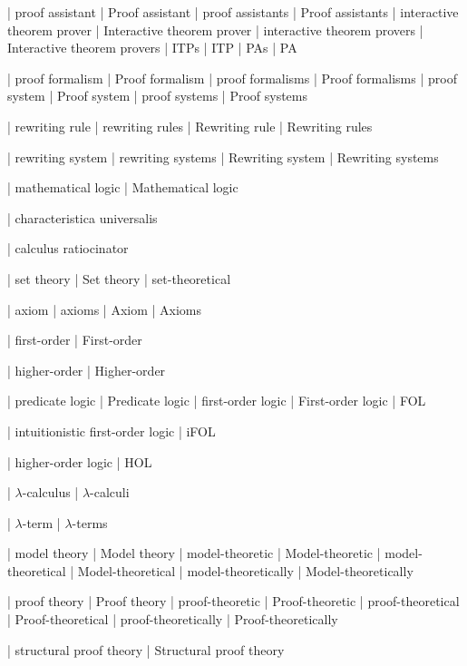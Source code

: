 
 | proof assistant
 | Proof assistant
 | proof assistants
 | Proof assistants
 | interactive theorem prover
 | Interactive theorem prover
 | interactive theorem provers
 | Interactive theorem provers
 | ITPs
 | ITP
 | PAs
 | PA

 | proof formalism
 | Proof formalism
 | proof formalisms
 | Proof formalisms
 | proof system
 | Proof system
 | proof systems
 | Proof systems

 | rewriting rule
 | rewriting rules
 | Rewriting rule
 | Rewriting rules

 | rewriting system
 | rewriting systems
 | Rewriting system
 | Rewriting systems

 | mathematical logic
 | Mathematical logic

 | characteristica universalis

 | calculus ratiocinator
 
 | set theory
 | Set theory
 | set-theoretical

 | axiom
 | axioms
 | Axiom
 | Axioms

 | first-order
 | First-order

 | higher-order
 | Higher-order

 | predicate logic
 | Predicate logic
 | first-order logic
 | First-order logic
 | FOL

 | intuitionistic first-order logic
 | iFOL
 
 | higher-order logic
 | HOL

 | $\lambda$-calculus
 | $\lambda$-calculi
 
 | $\lambda$-term
 | $\lambda$-terms

 | model theory
 | Model theory
 | model-theoretic
 | Model-theoretic
 | model-theoretical
 | Model-theoretical
 | model-theoretically
 | Model-theoretically

 | proof theory
 | Proof theory
 | proof-theoretic
 | Proof-theoretic
 | proof-theoretical
 | Proof-theoretical
 | proof-theoretically
 | Proof-theoretically

 | structural proof theory
 | Structural proof theory

